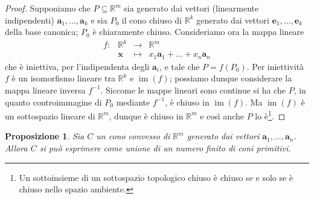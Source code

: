 \documentclass[italian, letter paper, 12pt, reqno]{article}
\theoremstyle{myteo}
\newtheorem{proposition}[theorem]{Proposizione}
\numberwithin{equation}{section}
\DeclareMathOperator{\im}{im}
\begin{document}
\begin{proof}
  Supponiamo che \(P\subseteq \mathbb{R}^m\) sia generato dai vettori (linearmente indipendenti) \(\mathbf{a}_1,\ldots,\mathbf{a}_k\) e sia \(P_0\) il cono chiuso di \(\mathbb{R}^k\) generato dai vettori \(\mathbf{e}_1,\ldots,\mathbf{e}_k\) della base canonica;  \(P_0\) è chiaramente chiuso.
  Consideriamo ora la mappa lineare
  \begin{equation*}
    \begin{array}{crcl}
      f\colon & \mathbb{R}^k & \to & \mathbb{R}^m\\
              & \mathbf{x} & \mapsto & x_1 \mathbf{a}_1 + \ldots + x_n \mathbf{a}_n
    \end{array}
  \end{equation*}
  che è iniettiva, per l'indipendenta degli \(\mathbf{a}_i\), e tale che \(P = f(P_0)\).
  Per iniettività \(f\) è un isomorfismo lineare tra \(\mathbb{R}^k\) e \(\im(f)\); possiamo dunque considerare la mappa lineare inversa \(f^{-1}\).
  Siccome le mappe lineari sono continue si ha che \(P\), in quanto controimmagine di \(P_0\) mediante \(f^{-1}\), è chiuso in \(\im(f)\).
  Ma \(\im(f)\) è un sottospazio lineare di \(\mathbb{R}^m\), dunque è chiuso in \(\mathbb{R}^m\) e così anche \(P\) lo è\footnote{Un sottoinsieme di un sottospazio topologico chiuso è chiuso se e solo se è chiuso nello spazio ambiente.}.
\end{proof}

\begin{proposition}
  \label{prop:unione_di_coni}
  Sia \(C\) un cono convesso di \(\mathbb{R}^m\) generato dai vettori \(\mathbf{a}_1,\ldots,\mathbf{a}_n\).
  Allora \(C\) si può esprimere come unione di un numero finito di coni primitivi.
\end{proposition}
\end{document}
